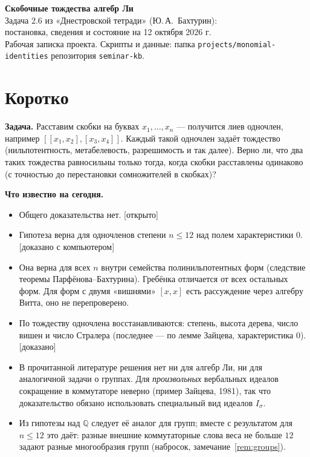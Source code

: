 \documentclass[11pt]{article}
\newcommand{\Q}{\mathbb Q}
\newcommand{\stat}[1]{\textsf{\small[#1]}}
\newcommand{\proved}{\stat{доказано}}
\newcommand{\comproved}{\stat{доказано с компьютером}}
\newcommand{\open}{\stat{открыто}}
\theoremstyle{plain}
\theoremstyle{definition}
\theoremstyle{remark}
\begin{document}
\begin{center}
{\LARGE\bfseries Скобочные тождества алгебр Ли}\\[6pt]
{\large Задача 2.6 из «Днестровской тетради» (Ю.\,А.~Бахтурин):\\ постановка, сведения и состояние на 12 октября 2026 г.}\\[8pt]
{\small Рабочая записка проекта. Скрипты и данные: папка \texttt{projects/monomial-identities} репозитория \texttt{seminar-kb}.}
\end{center}

\bigskip

\section*{Коротко}

\textbf{Задача.} Расставим скобки на буквах $x_1,\dots,x_n$ --- получится лиев одночлен, например $[[x_1,x_2],[x_3,x_4]]$. Каждый такой одночлен задаёт тождество (нильпотентность, метабелевость, разрешимость и так далее). Верно ли, что два таких тождества равносильны только тогда, когда скобки расставлены одинаково (с точностью до перестановки сомножителей в скобках)?

\textbf{Что известно на сегодня.}
\begin{itemize}
\item Общего доказательства нет. \open
\item Гипотеза верна для одночленов степени $n\le 12$ над полем характеристики $0$. \comproved
\item Она верна для всех $n$ внутри семейства полинильпотентных форм (следствие теоремы Парфёнова--Бахтурина). Гребёнка отличается от всех остальных форм. Для форм с двумя «вишнями» $[x,x]$ есть рассуждение через алгебру Витта, оно не перепроверено.
\item По тождеству одночлена восстанавливаются: степень, высота дерева, число вишен и число Стралера (последнее --- по лемме Зайцева, характеристика $0$). \proved
\item В прочитанной литературе решения нет ни для алгебр Ли, ни для аналогичной задачи о группах. Для \emph{произвольных} вербальных идеалов сокращение в коммутаторе неверно (пример Зайцева, 1981), так что доказательство обязано использовать специальный вид идеалов $I_\sigma$.
\item Из гипотезы над $\Q$ следует её аналог для групп; вместе с результатом для $n\le12$ это даёт: разные внешние коммутаторные слова веса не больше $12$ задают разные многообразия групп (набросок, замечание~\ref{rem:groups}).
\end{itemize}
\end{document}
